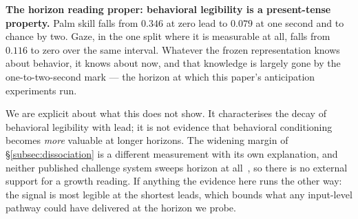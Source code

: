 \textbf{The horizon reading proper: behavioral legibility is a present-tense
property.} Palm skill falls from $0.346$ at zero lead to $0.079$ at one second and
to chance by two. Gaze, in the one split where it is measurable at all, falls from
$0.116$ to zero over the same interval. Whatever the frozen representation knows
about behavior, it knows about now, and that knowledge is largely gone by the
one-to-two-second mark --- the horizon at which this paper's anticipation
experiments run.

We are explicit about what this does not show. It characterises the decay of
behavioral legibility with lead; it is not evidence that behavioral conditioning
becomes \emph{more} valuable at longer horizons. The widening margin of
\S\ref{subsec:dissociation} is a different measurement with its own explanation,
and neither published challenge system sweeps horizon at
all~\citep{chu2026jfaa, wang2026tapjepa}, so there is no external support for a
growth reading. If anything the evidence here runs the other way: the signal is
most legible at the shortest leads, which bounds what any input-level pathway
could have delivered at the horizon we probe.
